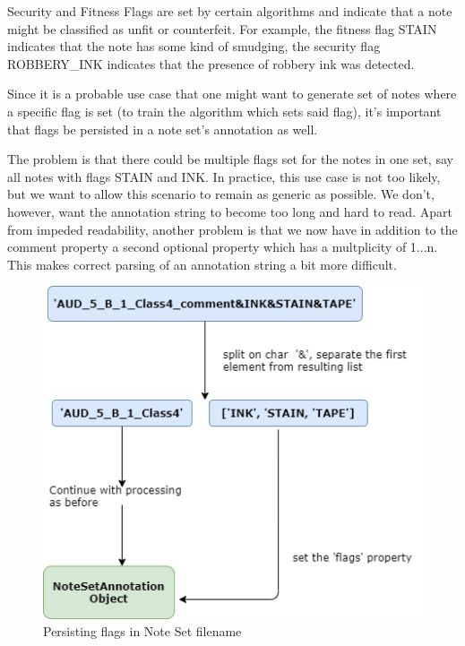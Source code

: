 Security and Fitness Flags are set by certain algorithms and indicate that a note might be classified as unfit or counterfeit. For example, the fitness flag STAIN indicates that the note has some kind of smudging, the security flag ROBBERY\_INK indicates that the presence of robbery ink was detected. \par
Since it is a probable use case that one might want to generate set of notes where a specific flag is set (to train the algorithm which sets said flag), it's important that flags be persisted in a note set's annotation as well. \par
The problem is that there could be multiple flags set for the notes in one set, say all notes with flags STAIN and INK. In practice, this use case is not too likely, but we want to allow this scenario to remain as generic as possible. We don't, however, want the annotation string to become too long and hard to read. 
Apart from impeded readability, another problem is that we now have in addition to the comment property a second optional property which has a multplicity of 1...n. This makes correct parsing of an annotation string a bit more difficult. 
\begin{figure}[hbt!]
\includegraphics[width=0.5\columnwidth]{images/notesetannotation_flags.png}
\caption{Persisting flags in Note Set filename}\label{fig:awesome_image1}
\end{figure}
